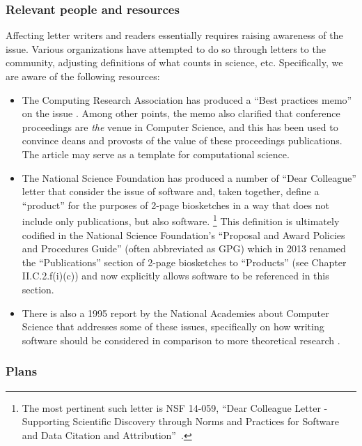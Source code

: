 \subsubsection{Relevant people and resources}

Affecting letter writers and readers essentially requires raising
awareness of the issue. Various organizations have attempted to do so
through letters to the community, adjusting definitions of what counts
in science, etc. Specifically, we are aware of the following
resources:

\begin{itemize}
\item The Computing Research Association has produced a ``Best
  practices memo'' on the issue \cite{PSU99}. Among other points,
  the memo also clarified that conference proceedings are
  \textit{the} venue in Computer Science, and this has been used to
  convince deans and provosts of the value of these proceedings
  publications. The article may serve as a template for computational
  science.
\item The National Science Foundation has produced a number of ``Dear
  Colleague'' letter that consider the issue of software and, taken
  together, define a ``product'' for the purposes of
  2-page biosketches in a way that does not include only publications, but also
  software.%
  \footnote{The most pertinent such letter is NSF
      14-059, ``Dear Colleague Letter - Supporting Scientific
      Discovery through Norms and Practices for Software and Data
      Citation and Attribution''~\cite{nsf-dcl-citation}.}
  This definition is ultimately codified in the National Science
  Foundation's ``Proposal and Award Policies and Procedures Guide''
  (often abbreviated as GPG) which in 2013 renamed the
  ``Publications'' section of 2-page biosketches to ``Products'' (see
  Chapter II.C.2.f(i)(c)) and now explicitly allows software to be
  referenced in this section.
\item There is also a 1995 report by the National Academies about
  Computer Science that addresses some of these issues, specifically
  on how writing software should be considered in comparison to more
  theoretical research \cite{NRC-careers-94}.
\end{itemize}



\subsubsection{Plans}

